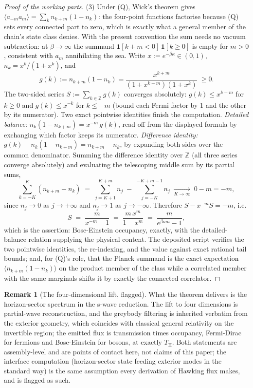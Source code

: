 \documentclass[11pt]{article}
\theoremstyle{definition}
\newtheorem{remark}[theorem]{Remark}
\renewcommand{\TH}{T_{\mathrm{H}}} %
\begin{document}
\begin{proof}[Proof of the working parts]
(3) Under (Q), Wick's theorem gives $\langle a_{-m} a_m\rangle = \sum_{k} n_{k+m}(1 - n_k)$: the four-point functions factorise because (Q) sets every connected part to zero, which is exactly what a general member of the chain's state class denies. With the present convention the sum needs no vacuum subtraction: at $\beta \to \infty$ the summand $\mathbf{1}[k + m < 0]\,\mathbf{1}[k \geq 0]$ is empty for $m > 0$, consistent with $a_m$ annihilating the sea. Write $x := e^{-\beta\kappa} \in (0,1)$, $n_k = x^k/(1 + x^k)$, and
\[
g(k) := n_{k+m}(1 - n_k) = \frac{x^{k+m}}{(1 + x^{k+m})(1 + x^k)} \;\geq 0.
\]
The two-sided series $S := \sum_{k \in \mathbb{Z}} g(k)$ converges absolutely: $g(k) \leq x^{k+m}$ for $k \geq 0$ and $g(k) \leq x^{-k}$ for $k \leq -m$ (bound each Fermi factor by $1$ and the other by its numerator). Two exact pointwise identities finish the computation. \emph{Detailed balance:} $n_k(1 - n_{k+m}) = x^{-m}\, g(k)$, read off from the displayed formula by exchanging which factor keeps its numerator. \emph{Difference identity:} $g(k) - n_k(1 - n_{k+m}) = n_{k+m} - n_k$, by expanding both sides over the common denominator. Summing the difference identity over $\mathbb{Z}$ (all three series converge absolutely) and evaluating the telescoping middle sum by its partial sums,
\[
\sum_{k=-K}^{K} (n_{k+m} - n_k) \;=\; \sum_{j=K+1}^{K+m} n_j \;-\; \sum_{j=-K}^{-K+m-1} n_j \;\xrightarrow[K \to \infty]{}\; 0 - m = -m ,
\]
since $n_j \to 0$ as $j \to +\infty$ and $n_j \to 1$ as $j \to -\infty$. Therefore $S - x^{-m} S = -m$, i.e.
\[
S \;=\; \frac{m}{x^{-m} - 1} \;=\; \frac{m\,x^m}{1 - x^m} \;=\; \frac{m}{e^{\beta\kappa m} - 1} ,
\]
which is the assertion: Bose-Einstein occupancy, exactly, with the detailed-balance relation supplying the physical content. The deposited script verifies the two pointwise identities, the re-indexing, and the value against exact rational tail bounds; and, for (Q)'s role, that the Planck summand is the exact expectation $\langle n_{k+m}(1 - n_k)\rangle$ on the product member of the class while a correlated member with the same marginals shifts it by exactly the connected correlator.
\end{proof}

\begin{remark}[The four-dimensional lift, flagged]\label{rem:lift}
What the theorem delivers is the horizon-sector spectrum in the s-wave reduction. The lift to four dimensions is partial-wave reconstruction, and the greybody filtering is inherited verbatim from the exterior geometry, which coincides with classical general relativity on the invertible region; the emitted flux is transmission times occupancy, Fermi-Dirac for fermions and Bose-Einstein for bosons, at exactly $\TH$. Both statements are assembly-level and are points of contact here, not claims of this paper; the interface computation (horizon-sector state feeding exterior modes in the standard way) is the same assumption every derivation of Hawking flux makes, and is flagged as such.
\end{remark}
\end{document}
